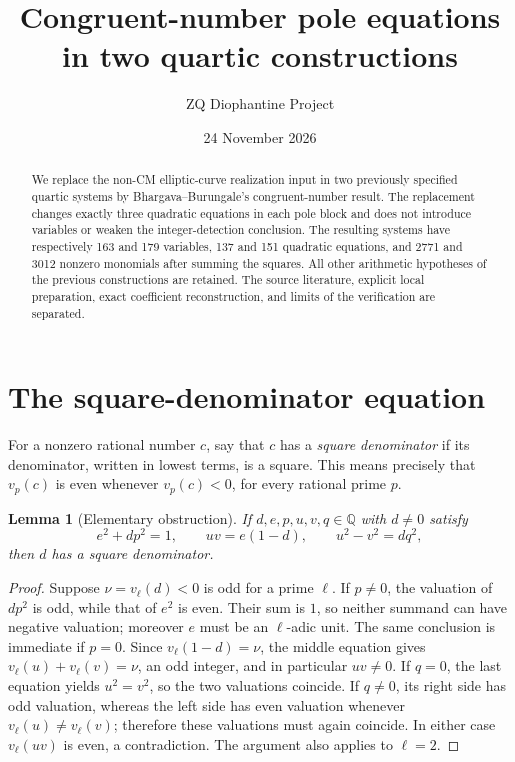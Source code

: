 \documentclass[11pt,a4paper]{article}
\title{Congruent-number pole equations in two quartic constructions}
\author{ZQ Diophantine Project}
\date{24 November 2026}
\newtheorem{lemma}[theorem]{Lemma}
\theoremstyle{remark}
\newcommand{\Q}{\mathbb Q}
\begin{document}
\maketitle

\begin{abstract}
We replace the non-CM elliptic-curve realization input in two
previously specified quartic systems by Bhargava--Burungale's
congruent-number result. The replacement changes exactly three
quadratic equations in each pole block and does not introduce
variables or weaken the integer-detection conclusion. The resulting
systems have respectively 163 and 179 variables, 137 and 151
quadratic equations, and 2771 and 3012 nonzero monomials after
summing the squares. All other arithmetic hypotheses of the previous
constructions are retained. The source literature, explicit
local preparation, exact coefficient reconstruction, and limits of
the verification are separated.
\end{abstract}

\section{The square-denominator equation}

For a nonzero rational number $c$, say that $c$ has a
\emph{square denominator} if its denominator, written in lowest terms,
is a square. This means precisely that $v_p(c)$ is even whenever
$v_p(c)<0$, for every rational prime $p$.

\begin{lemma}[Elementary obstruction]\label{lem:sound}
If $d,e,p,u,v,q\in\Q$ with $d\ne0$ satisfy
\begin{equation}\label{eq:cm}
 e^2+dp^2=1,\qquad
 uv=e(1-d),\qquad
 u^2-v^2=dq^2,
\end{equation}
then $d$ has a square denominator.
\end{lemma}
\begin{proof}
Suppose $\nu=v_\ell(d)<0$ is odd for a prime $\ell$.
If $p\ne0$, the valuation of $dp^2$ is odd, while that of
$e^2$ is even. Their sum is $1$, so neither summand can have
negative valuation; moreover $e$ must be an $\ell$-adic unit.
The same conclusion is immediate if $p=0$.
Since $v_\ell(1-d)=\nu$, the middle equation gives
$v_\ell(u)+v_\ell(v)=\nu$, an odd integer, and in particular
$uv\ne0$.
If $q=0$, the last equation yields $u^2=v^2$, so the two
valuations coincide. If $q\ne0$, its right side has odd
valuation, whereas the left side has even valuation whenever
$v_\ell(u)\ne v_\ell(v)$; therefore these valuations must
again coincide. In either case $v_\ell(uv)$ is even, a
contradiction. The argument also applies to $\ell=2$.
\end{proof}
\end{document}
